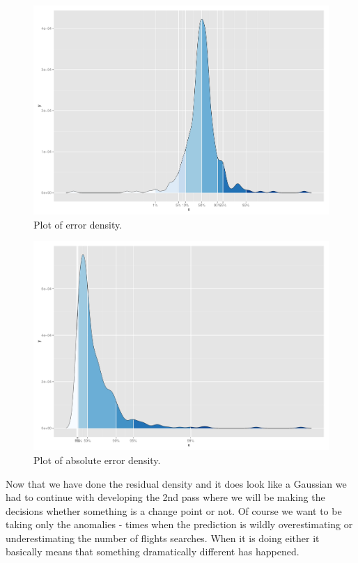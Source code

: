 \documentclass[minf,twoside,singlespacing,parskip,frontabs,notimes,12pt]{infthesis} %
\begin{document}
\begin{figure}[]
\begin{center}
\includegraphics[width=\textwidth]{percentiles}
\end{center}
\caption{Plot of error density.}
\label{error-density}
\end{figure}
\begin{figure}[]
\begin{center}
\includegraphics[width=\textwidth]{error_plot}
\end{center}
\caption{Plot of absolute error density.}
\label{abs-error-density}
\end{figure}

Now that we have done the residual density and it does look like a Gaussian we had to continue with developing the 2nd pass where we will be making the decisions whether something is a change point or not. Of course we want to be taking only the anomalies - times when the prediction is wildly overestimating or underestimating the number of flights searches. When it is doing either it basically means that something dramatically different has happened. 
\end{document}
